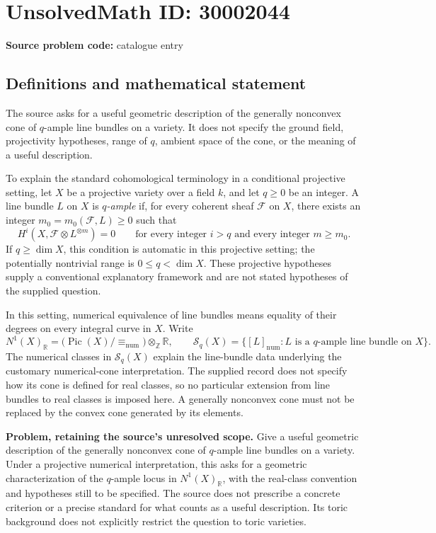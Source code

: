 \documentclass[11pt]{article}
\newcommand{\Z}{\mathbb{Z}}
\newcommand{\R}{\mathbb{R}}
\begin{document}
\section*{UnsolvedMath ID: 30002044}
\textbf{Source problem code:} catalogue entry
\subsection{Definitions and mathematical statement}
The source asks for a useful geometric description of the generally nonconvex cone of \(q\)-ample line bundles on a variety. It does not specify the ground field, projectivity hypotheses, range of \(q\), ambient space of the cone, or the meaning of a useful description.

To explain the standard cohomological terminology in a conditional projective setting, let \(X\) be a projective variety over a field \(k\), and let \(q\geq 0\) be an integer. A line bundle \(L\) on \(X\) is \emph{\(q\)-ample} if, for every coherent sheaf \(\mathcal F\) on \(X\), there exists an integer \(m_0=m_0(\mathcal F,L)\geq 0\) such that
\[
 H^i\!\left(X,\mathcal F\otimes L^{\otimes m}\right)=0
 \qquad\text{for every integer }i>q\text{ and every integer }m\geq m_0.
\]
If \(q\geq\dim X\), this condition is automatic in this projective setting; the potentially nontrivial range is \(0\leq q<\dim X\). These projective hypotheses supply a conventional explanatory framework and are not stated hypotheses of the supplied question.

In this setting, numerical equivalence of line bundles means equality of their degrees on every integral curve in \(X\). Write
\[
 N^1(X)_{\R}
 =\bigl(\operatorname{Pic}(X)/{\equiv_{\mathrm{num}}}\bigr)
   \otimes_{\Z}\R,
 \qquad
 \mathcal S_q(X)=\{[L]_{\mathrm{num}}:L\text{ is a }q\text{-ample line bundle on }X\}.
\]
The numerical classes in \(\mathcal S_q(X)\) explain the line-bundle data underlying the customary numerical-cone interpretation. The supplied record does not specify how its cone is defined for real classes, so no particular extension from line bundles to real classes is imposed here. A generally nonconvex cone must not be replaced by the convex cone generated by its elements.

\textbf{Problem, retaining the source's unresolved scope.} Give a useful geometric description of the generally nonconvex cone of \(q\)-ample line bundles on a variety. Under a projective numerical interpretation, this asks for a geometric characterization of the \(q\)-ample locus in \(N^1(X)_{\R}\), with the real-class convention and hypotheses still to be specified. The source does not prescribe a concrete criterion or a precise standard for what counts as a useful description. Its toric background does not explicitly restrict the question to toric varieties.
\end{document}
